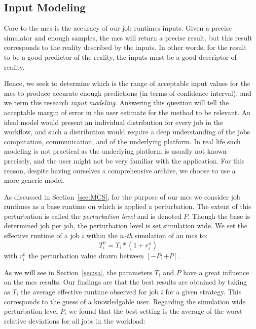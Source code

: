 \documentclass[10pt,conference,compsocconf]{IEEEtran}
\begin{document}
\subsection{Input Modeling}\label{sec:im}

Core  to the  \acl{mcs} is  the accuracy  of our  job runtimes  inputs. Given  a
precise simulator and enough samples, the \ac{mcs} will return a precise result,
but this  result corresponds to  the reality described  by the inputs.  In other
words, for the result to be a good  predictor of the reality, the inputs must be
a good descriptor of reality.

Hence, we seek  to determine which is  the range of acceptable  input values for
the  \ac{mcs} to  produce accurate  enough predictions  (in terms  of confidence
interval),  and we  term this  research \emph{input  modeling}.  Answering  this
question will tell the  acceptable margin of error in the  user estimate for the
method to be relevant.
An ideal  model would present  an individual distribution  for every job  in the
workflow, and such a distribution would require a deep understanding of the jobs
computation, communication, and  of the underlying platform.  In  real life such
modeling  is not  practical  as the  underlying platform  is  usually not  known
precisely, and  the user might  not be very  familiar with the  application. For
this reason, despite having ourselves a  comprehensive archive, we choose to use
a more generic model.

As discussed in Section~\ref{sec:MCS}, for the purpose of our \ac{mcs} we
consider job runtimes as a base runtime on which is applied a perturbation.  The
extent of this perturbation is called the \emph{perturbation level} and is
denoted $P$. Though the base is determined job per job, the perturbation level
is set simulation wide. We set the effective runtime of a job $i$ within the
$n$\textit{-th} simulation of an \ac{mcs} to: \[T_i^n = T_i * (1+r_i^n)\] with
$r_i^n$ the perturbation value drawn between $[-P;+P]$.

As we  will see  in Section~\ref{sec:sa},  the parameters $T_i$  and $P$  have a
great influence on the \ac{mcs} results.  Our findings are that the best results
are obtained by  taking as $T_i$ the average effective  runtime observed for job
$i$ for a given  strategy. This corresponds to the guess of a knowledgable user.
Regarding  the simulation  wide perturbation level  $P$, we found  that the best
setting  is the average  of the worst relative deviations for all jobs in the
workload:
\end{document}
